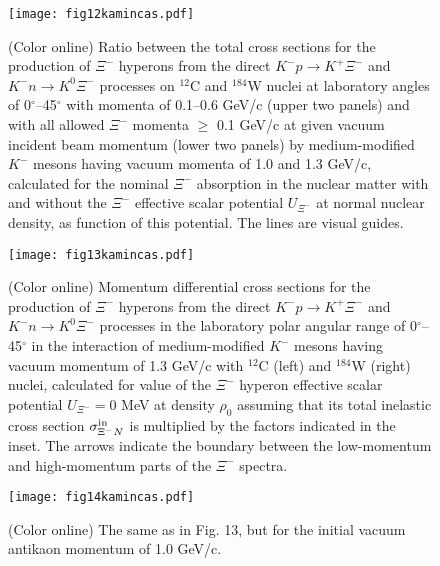 \documentclass[12pt]{article}
\begin{document}
\begin{figure}[!h]
\begin{center}
\texttt{[image: fig12kamincas.pdf]}
\vspace*{-2mm} \caption{(Color online) Ratio between the total cross sections for the production of $\Xi^-$
hyperons from the direct ${K^-}p \to {K^+}{\Xi^-}$ and ${K^-}n \to {K^0}{\Xi^-}$
processes on $^{12}$C and $^{184}$W nuclei at laboratory angles of 0$^{\circ}$--45$^{\circ}$ with
momenta of 0.1--0.6 GeV/c (upper two panels) and with all allowed $\Xi^-$ momenta $\ge$ 0.1 GeV/c at given
vacuum incident beam momentum (lower two panels) by medium-modified $K^-$ mesons having vacuum momenta
of 1.0 and 1.3 GeV/c, calculated for the nominal $\Xi^-$ absorption in the nuclear matter
with and without the $\Xi^-$ effective scalar potential $U_{\Xi^-}$ at normal nuclear density,
as function of this potential. The lines are visual guides.}
\label{void}
\end{center}
\end{figure}
\begin{figure}[!h]
\begin{center}
\texttt{[image: fig13kamincas.pdf]}
\vspace*{-2mm} \caption{(Color online) Momentum differential cross sections for the production of $\Xi^-$
hyperons from the direct ${K^-}p \to {K^+}{\Xi^-}$ and ${K^-}n \to {K^0}{\Xi^-}$
processes in the laboratory polar angular range of 0$^{\circ}$--45$^{\circ}$ in the interaction of medium-modified
$K^-$ mesons having vacuum momentum of 1.3 GeV/c with $^{12}$C
(left) and $^{184}$W (right) nuclei, calculated for value of the $\Xi^-$ hyperon effective
scalar potential $U_{\Xi^-}=0$ MeV at density $\rho_0$ assuming that its total inelastic
cross section $\sigma_{{\Xi^-}N}^{\rm in}$ is multiplied by the factors indicated in the inset.
The arrows indicate the boundary between the low-momentum and high-momentum parts of the $\Xi^-$ spectra.}
\label{void}
\end{center}
\end{figure}
\begin{figure}[!h]
\begin{center}
\texttt{[image: fig14kamincas.pdf]}
\vspace*{-2mm} \caption{(Color online) The same as in Fig. 13,
but for the initial vacuum antikaon momentum of 1.0 GeV/c.}
\label{void}
\end{center}
\end{figure}
\end{document}
